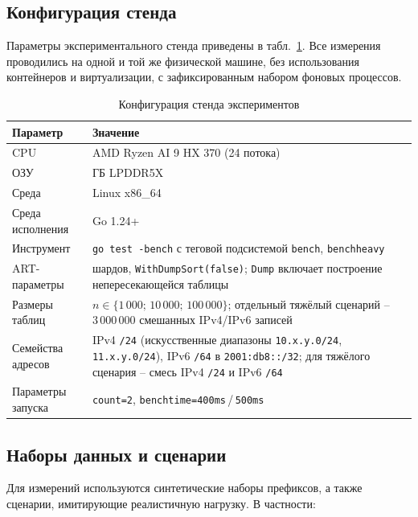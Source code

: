 \subsection{Конфигурация стенда}

Параметры экспериментального стенда приведены в
табл.~\ref{tab:bench-setup}. Все измерения проводились на одной и той
же физической машине, без использования контейнеров и виртуализации,
с зафиксированным набором фоновых процессов.

\begin{table}[ht]
\centering
\caption{Конфигурация стенда экспериментов}
\label{tab:bench-setup}
\small
\begin{tabular}{>{\raggedright\arraybackslash}p{4.5cm}>{\raggedright\arraybackslash}p{8.5cm}}
\toprule
Параметр & Значение \\
\midrule
CPU                  & AMD Ryzen AI 9 HX 370 (24 потока) \\
ОЗУ                  & 32 ГБ LPDDR5X \\
Среда                & Linux x86\_64 \\
Среда исполнения     & Go 1.24+ \\
Инструмент           & \texttt{go test -bench} с теговой подсистемой \texttt{bench}, \texttt{benchheavy} \\
ART-параметры        & 16 шардов, \texttt{WithDumpSort(false)}; \texttt{Dump} включает построение непересекающейся таблицы \\
	Размеры таблиц       & $n \in \{1\,000;\, 10\,000;\, 100\,000\}$; отдельный тяжёлый сценарий -- $3\,000\,000$ смешанных IPv4/IPv6 записей \\
	Семейства адресов    & IPv4 \texttt{/24} (искусственные диапазоны \texttt{10.x.y.0/24}, \texttt{11.x.y.0/24}), IPv6 \texttt{/64} в \texttt{2001:db8::/32}; для тяжёлого сценария -- смесь IPv4 \texttt{/24} и IPv6 \texttt{/64} \\
Параметры запуска    & \texttt{count=2}, \texttt{benchtime=400ms}\,/\,\texttt{500ms} \\
\bottomrule
\end{tabular}
\end{table}

\subsection{Наборы данных и сценарии}

Для измерений используются синтетические наборы префиксов, а также
сценарии, имитирующие реалистичную нагрузку. В частности:

